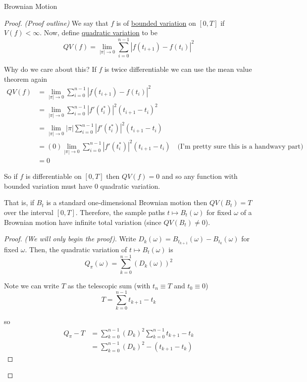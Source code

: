 \documentclass[12pt]{article}
\newenvironment{theorem}[2][Theorem:]{\begin{trivlist} %
\item[\hskip \labelsep {\bfseries #1}\hskip \labelsep {\bfseries #2.}]}{\end{trivlist}}
\newlength\tindent
\renewcommand{\indent}{\hspace*{\tindent}}
\begin{document}
\begin{section}{Brownian Motion}
\begin{theorem}{Brownian motion is continuous everywhere but differentiable nowhere}
\begin{proof} {\em (Proof outline)}
\indent We say that $f$ is of \underline{bounded variation} on $[0,T]$ if $V(f) < \infty$. Now, define \underline{quadratic variation} to be
\begin{equation*}
	QV(f) = \lim_{|\pi|\to 0} \sum^{n-1}_{i = 0} |f(t_{i+1}) - f(t_i)|^2
\end{equation*}

\indent Why do we care about this? If $f$ is twice differentiable we can use the mean value theorem again
\begin{align*}
	QV(f) &= \lim_{|\pi|\to 0} \sum^{n-1}_{i = 0} |f(t_{i+1}) - f(t_i)|^2 \\
	&= \lim_{|\pi|\to 0} \sum^{n-1}_{i = 0}|f'(t^*_i)|^2(t_{i+1} - t_i)^2 \\
	&= \lim_{|\pi|\to 0} |\pi| \sum^{n-1}_{i = 0}|f'(t^*_i)|^2(t_{i+1} - t_i) \\
	&= (0) \lim_{|\pi|\to 0} \sum^{n-1}_{i = 0}|f'(t^*_i)|^2(t_{i+1} - t_i) \quad \text{(I'm pretty sure this is a handwavy part)} \\
	&= 0
\end{align*}

\indent So if $f$ is differentiable on $[0,T]$ then $QV(f) = 0$ and so any function with bounded variation must have 0 quadratic variation.

\begin{theorem}{The quadratic variation of a Brownian motion is nonzero} That is, if $B_t$ is a standard one-dimensional Brownian motion then $QV(B_t) = T$ over the interval $[0,T]$. Therefore, the sample paths $t \mapsto B_t(\omega)$ for fixed $\omega$ of a Brownian motion have infinite total variation (since $QV(B_t) \neq 0$).

\begin{proof} {\em (We will only begin the proof)}. Write $D_k(\omega) = B_{t_{k+1}}(\omega) - B_{t_{k}}(\omega)$ for fixed $\omega$. Then, the quadratic variation of $t \mapsto B_t(\omega)$ is
\begin{equation*}
	Q_\pi(\omega) = \sum^{n-1}_{k = 0} \left( D_k(\omega) \right)^2
\end{equation*}

Note we can write $T$ as the telescopic sum (with $t_n \equiv T$ and $t_0 \equiv 0$)
\begin{equation*}
	T = \sum^{n - 1}_{k = 0} t_{k + 1} - t_k
\end{equation*}

so
\begin{align*}
	Q_\pi - T &= \sum^{n - 1}_{k = 0} \left( D_k \right)^2  \sum^{n - 1}_{k = 0}  t_{k+1} - t_k \\
	&= \sum^{n - 1}_{k = 0} \left( D_k \right)^2 - (t_{k + 1} - t_k)
\end{align*}


\end{proof}
\end{theorem}
\end{proof}
\end{theorem}
\end{section}
\end{document}
